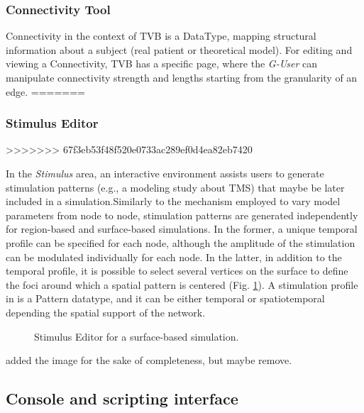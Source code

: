 	\subsubsection{Connectivity Tool}

Connectivity in the context of TVB is a DataType, mapping structural information about a subject (real patient or theoretical model).
For editing and viewing a Connectivity, TVB has a specific page, where the \emph{G-User} can manipulate connectivity strength and lengths 
starting from the granularity of an edge.
=======
\subsubsection{Stimulus Editor}
>>>>>>> 67f3eb53f48f520e0733ac289ef0d4ea82eb7420

  In the \emph{Stimulus} area, an interactive environment assists users to
  generate stimulation patterns (e.g., a modeling study about TMS) that maybe be
  later included in a simulation.Similarly to the mechanism employed to vary
  model parameters from node to node, stimulation patterns are generated
  independently for region-based and surface-based simulations. In the former, a
  unique temporal profile can be specified for each node, although the amplitude
  of the stimulation can be modulated individually for each node. In the latter,
  in addition to the temporal profile, it is possible to select several vertices
  on the surface to define the foci around which a spatial pattern is centered
  (Fig. \ref{fig:stimulus}). A stimulation profile in \TVB is a Pattern
  datatype, and it can be either temporal or spatiotemporal depending the
  spatial support of the network.

  \begin{figure}[!htbp]
    \centering
    \caption{Stimulus Editor for a surface-based simulation.}
        \label{fig:stimulus}
  \end{figure}

  \note[psl] added the image for the sake of completeness, but maybe remove.  

\subsection{Console and scripting interface}

